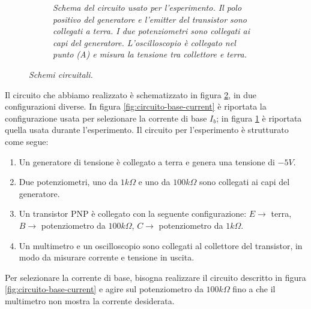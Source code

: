 \begin{figure}[h]
\begin{subfigure}[t]{.47\textwidth}
      \caption{
        \emph{
          Schema del circuito usato per l'esperimento. Il polo positivo del generatore e l'\emph{emitter}
          del transistor sono collegati a terra. I due potenziometri sono collegati ai capi del generatore. L'oscilloscopio
          è collegato nel punto (A) e misura la tensione tra collettore e terra.
        }
      }
      \label{fig:circuito-prova}
    \end{subfigure}
    \caption{\emph{Schemi circuitali.}}
    \label{fig:circuiti}
  \end{figure}

  Il circuito che abbiamo realizzato è schematizzato in figura \ref{fig:circuiti}, in due configurazioni diverse. In figura \ref{fig:circuito-base-current}
  è riportata la configurazione usata per selezionare la corrente di base $I_b$; in figura \ref{fig:circuito-prova}
  è riportata quella usata durante l'esperimento. Il circuito per l'esperimento è strutturato come segue:
  \begin{enumerate}
    \item%
    Un generatore di tensione è collegato a terra e genera una tensione di $-5V$.
    \item
    Due potenziometri, uno da $1k\Omega$ e uno da $100k\Omega$ sono collegati ai capi del generatore.
    \item
    Un transistor PNP è collegato con la seguente configurazione: $E \to$ terra, $B \to$ potenziometro da $100k\Omega$,
    $C \to$ potenziometro da $1k\Omega$.
    \item
    Un multimetro e un oscilloscopio sono collegati al collettore del transistor, in modo da misurare corrente e tensione
    in uscita.
  \end{enumerate}
  Per selezionare la corrente di base, bisogna realizzare il circuito descritto in figura \ref{fig:circuito-base-current}
  e agire sul potenziometro da $100k\Omega$ fino a che il multimetro non mostra la corrente desiderata.

